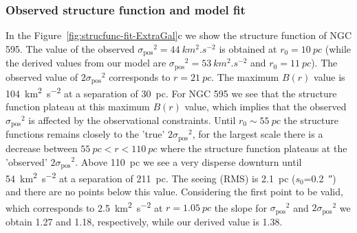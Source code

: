 \documentclass[fleqn,usenatbib, useAMS, a4paper]{mnras}
\newcommand\pos{\ensuremath{_{\mathrm{pos}}}}
\begin{document}


\subsubsection{Observed structure function and model fit}
\label{sec:observ-struct-funct-m33}

In the Figure~\ref{fig:strucfunc-fit-ExtraGal}c we show the structure function of NGC 595.
The value of the observed \(\sigma\pos^2 = \SI{44}{km^{2}.s^{-2}}\) is obtained at \(r_0 = \SI{10}{pc} \) (while the derived values from our model are \(\sigma\pos^2 = \SI{53}{km^{2}.s^{-2}}\) and \(r_0 = \SI{11}{pc} \)).
The observed value of \(2\sigma\pos^2\) corresponds to \(r = \SI{21}{pc} \).
The maximum \(B(r)\) value is \SI{104}{km^{2}.s^{-2}} at a separation of \SI{30}{pc}. 
For NGC 595 we see that the structure function plateau at this maximum \(B(r)\) value, which implies that the observed \(\sigma\pos^2\) is affected by the observational constraints.
Until \(r_0 \sim \SI{55}{pc} \) the structure functions remains closely to the 'true' \(2\sigma\pos^2\), for the largest scale there is a decrease between  \(\SI{55}{pc} < r < \SI{110}{pc} \) where the structure function plateaus at the 'observed' \(2\sigma\pos^2\). 
Above \SI{110}{pc} we see a very disperse downturn  until \SI{54}{km^{2}.s^{-2}} at a separation of \SI{211}{pc}.
The seeing (RMS) is \SI{2.1}{pc} (\(s_0\)=\SI{0.2}{\arcsecond}) and there are no points below this value.
Considering the first point to be valid, which corresponds to \SI{2.5}{km^{2}.s^{-2}} at \(r = \SI{1.05}{pc} \) the slope for \(\sigma\pos^2\) and \(2\sigma\pos^2\) we obtain \num{1.27} and \num{1.18}, respectively, while our derived value is \num{1.38}.
\end{document}
